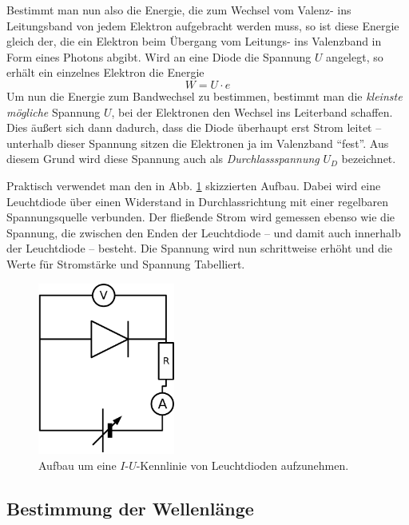 Bestimmt man nun also die Energie, die zum Wechsel vom Valenz- ins Leitungsband von jedem Elektron aufgebracht werden muss, so ist diese Energie gleich der, die ein Elektron beim Übergang vom Leitungs- ins Valenzband in Form eines Photons abgibt. Wird an eine Diode die Spannung $U$ angelegt, so erhält ein einzelnes Elektron die Energie
\begin{equation}
   W = U \cdot e
   \label{eq_wue}
\end{equation}
Um nun die Energie zum Bandwechsel zu bestimmen, bestimmt man die \emph{kleinste mögliche} Spannung $U$, bei der Elektronen den Wechsel ins Leiterband schaffen. Dies äußert sich dann dadurch, dass die Diode überhaupt erst Strom leitet -- unterhalb dieser Spannung sitzen die Elektronen ja im Valenzband "`fest"'. Aus diesem Grund wird diese Spannung auch als \emph{Durchlassspannung} $U_D$ bezeichnet.

Praktisch verwendet man den in Abb. \ref{abb_schaltung} skizzierten Aufbau. Dabei wird eine Leuchtdiode über einen Widerstand in Durchlassrichtung mit einer regelbaren Spannungsquelle verbunden. Der fließende Strom wird gemessen ebenso wie die Spannung, die zwischen den Enden der Leuchtdiode -- und damit auch innerhalb der Leuchtdiode -- besteht. Die Spannung wird nun schrittweise erhöht und die Werte für Stromstärke und Spannung Tabelliert.


\begin{figure}
   \centering
   \includegraphics[width=0.4\textwidth]{praktika/mat_praktika/schaltung01}
   \caption{Aufbau um eine $I$-$U$-Kennlinie von Leuchtdioden aufzunehmen.}
   \label{abb_schaltung}
\end{figure}








\subsection{Bestimmung der Wellenlänge}

